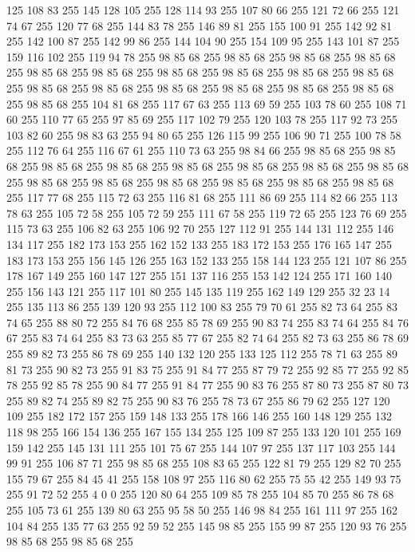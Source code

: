 125 108 83 255 145 128 105 255 128 114 93 255 107 80 66 255 121 72 66 255 121 74 67 255 120 77 68 255 144 83 78 255 146 89 81 255 155 100 91 255 142 92 81 255 142 100 87 255 142 99 86 255 144 104 90 255 154 109 95 255 143 101 87 255 159 116 102 255 119 94 78 255 98 85 68 255 98 85 68 255 98 85 68 255 98 85 68 255 98 85 68 255 98 85 68 255 98 85 68 255 98 85 68 255 98 85 68 255 98 85 68 255 98 85 68 255 98 85 68 255 98 85 68 255 98 85 68 255 98 85 68 255 98 85 68 255 98 85 68 255 104 81 68 255 117 67 63 255 113 69 59 255 103 78 60 255 108 71 60 255 110 77 65 255 97 85 69 255 117 102 79 255 120 103 78 255 117 92 73 255 103 82 60 255 98 83 63 255 94 80 65 255 126 115 99 255 106 90 71 255 100 78 58 255 112 76 64 255 116 67 61 255 110 73 63 255 98 84 66 255 98 85 68 255 98 85 68 255 98 85 68 255 98 85 68 255 98 85 68 255 98 85 68 255 98 85 68 255 98 85 68 255 98 85 68 255
98 85 68 255 98 85 68 255 98 85 68 255 98 85 68 255 98 85 68 255 117 77 68 255 115 72 63 255 116 81 68 255 111 86 69 255 114 82 66 255 113 78 63 255 105 72 58 255 105 72 59 255 111 67 58 255 119 72 65 255 123 76 69 255 115 73 63 255 106 82 63 255 106 92 70 255 127 112 91 255 144 131 112 255 146 134 117 255 182 173 153 255 162 152 133 255 183 172 153 255 176 165 147 255 183 173 153 255 156 145 126 255 163 152 133 255 158 144 123 255 121 107 86 255 178 167 149 255 160 147 127 255 151 137 116 255 153 142 124 255 171 160 140 255 156 143 121 255 117 101 80 255 145 135 119 255 162 149 129 255 32 23 14 255 135 113 86 255 139 120 93 255 112 100 83 255 79 70 61 255 82 73 64 255 83 74 65 255 88 80 72 255 84 76 68 255 85 78 69 255 90 83 74 255 83 74 64 255 84 76 67 255 83 74 64 255 83 73 63 255 85 77 67 255 82 74 64 255 82 73 63 255 86 78 69 255 89 82 73 255 86 78 69 255 140 132 120 255 133 125 112 255 78 71 63 255
89 81 73 255 90 82 73 255 91 83 75 255 91 84 77 255 87 79 72 255 92 85 77 255 92 85 78 255 92 85 78 255 90 84 77 255 91 84 77 255 90 83 76 255 87 80 73 255 87 80 73 255 89 82 74 255 89 82 75 255 90 83 76 255 78 73 67 255 86 79 62 255 127 120 109 255 182 172 157 255 159 148 133 255 178 166 146 255 160 148 129 255 132 118 98 255 166 154 136 255 167 155 134 255 125 109 87 255 133 120 101 255 169 159 142 255 145 131 111 255 101 75 67 255 144 107 97 255 137 117 103 255 144 99 91 255 106 87 71 255 98 85 68 255 108 83 65 255 122 81 79 255 129 82 70 255 155 79 67 255 84 45 41 255 158 108 97 255 116 80 62 255 75 55 42 255 149 93 75 255 91 72 52 255 4 0 0 255 120 80 64 255 109 85 78 255 104 85 70 255 86 78 68 255 105 73 61 255 139 80 63 255 95 58 50 255 146 98 84 255 161 111 97 255 162 104 84 255 135 77 63 255 92 59 52 255 145 98 85 255 155 99 87 255 120 93 76 255 98 85 68 255 98 85 68 255
